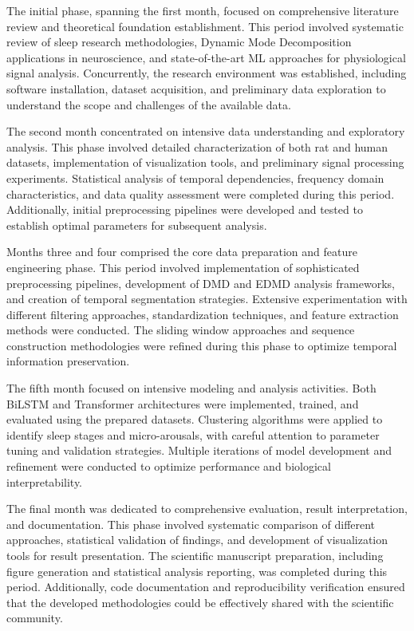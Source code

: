 \documentclass[a4paper,12pt,twoside]{article}
\begin{document}
The initial phase, spanning the first month, focused on comprehensive literature review and theoretical foundation establishment. This period involved systematic review of sleep research methodologies, Dynamic Mode Decomposition applications in neuroscience, and state-of-the-art ML approaches for physiological signal analysis. Concurrently, the research environment was established, including software installation, dataset acquisition, and preliminary data exploration to understand the scope and challenges of the available data.

The second month concentrated on intensive data understanding and exploratory analysis. This phase involved detailed characterization of both rat and human datasets, implementation of visualization tools, and preliminary signal processing experiments. Statistical analysis of temporal dependencies, frequency domain characteristics, and data quality assessment were completed during this period. Additionally, initial preprocessing pipelines were developed and tested to establish optimal parameters for subsequent analysis.

Months three and four comprised the core data preparation and feature engineering phase. This period involved implementation of sophisticated preprocessing pipelines, development of DMD and EDMD analysis frameworks, and creation of temporal segmentation strategies. Extensive experimentation with different filtering approaches, standardization techniques, and feature extraction methods were conducted. The sliding window approaches and sequence construction methodologies were refined during this phase to optimize temporal information preservation.

The fifth month focused on intensive modeling and analysis activities. Both BiLSTM and Transformer architectures were implemented, trained, and evaluated using the prepared datasets. Clustering algorithms were applied to identify sleep stages and micro-arousals, with careful attention to parameter tuning and validation strategies. Multiple iterations of model development and refinement were conducted to optimize performance and biological interpretability.

The final month was dedicated to comprehensive evaluation, result interpretation, and documentation. This phase involved systematic comparison of different approaches, statistical validation of findings, and development of visualization tools for result presentation. The scientific manuscript preparation, including figure generation and statistical analysis reporting, was completed during this period. Additionally, code documentation and reproducibility verification ensured that the developed methodologies could be effectively shared with the scientific community.
\end{document}
